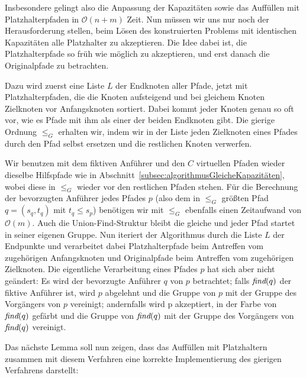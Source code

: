 Insbesondere gelingt also die Anpassung der Kapazitäten sowie das Auffüllen mit Platzhalterpfaden in $\mathcal O(n+m)$ Zeit.
Nun müssen wir uns nur noch der Herausforderung stellen, beim Lösen des konstruierten Problems mit identischen Kapazitäten alle
Platzhalter zu akzeptieren.
Die Idee dabei ist, die Platzhalterpfade so früh wie möglich zu akzeptieren, und erst danach die Originalpfade zu
betrachten.

Dazu wird zuerst eine Liste $L$ der Endknoten aller Pfade, jetzt mit Platzhalterpfaden, die die Knoten
aufsteigend und bei gleichem Knoten Zielknoten vor Anfangsknoten sortiert.
Dabei kommt jeder Knoten genau so oft vor, wie es Pfade mit ihm als einer der beiden Endknoten gibt.
Die gierige Ordnung $\leq_{G}$ erhalten wir, indem wir in der Liste jeden Zielknoten eines Pfades durch den Pfad selbst
ersetzen und die restlichen Knoten verwerfen.

Wir benutzen mit dem fiktiven Anführer und den $C$ virtuellen Pfaden wieder dieselbe Hilfspfade wie in
Abschnitt~\ref{subsec:algorithmusGleicheKapazitäten}, wobei diese in $\leq_G$ wieder vor den restlichen Pfaden stehen.
Für die Berechnung der bevorzugten Anführer jedes Pfades $p$ (also dem in $\leq_G$ größten Pfad $q = (s_q, t_q)$ mit
$t_q \leq s_p$) benötigen wir mit $\leq_G$ ebenfalls einen Zeitaufwand von
$\mathcal O(m)$.
Auch die Union-Find-Struktur bleibt die gleiche und jeder Pfad startet in seiner eigenen Gruppe.
Nun iteriert der Algorithmus durch die Liste $L$ der Endpunkte und verarbeitet dabei Platzhalterpfade beim Antreffen vom
zugehörigen Anfangsknoten und Originalpfade beim Antreffen vom zugehörigen Zielknoten.
Die eigentliche Verarbeitung eines Pfades $p$ hat sich aber nicht geändert: Es wird der bevorzugte Anführer $q$ von $p$
betrachtet;
falls $\text{\em find}(q)$ der fiktive Anführer ist, wird $p$ abgelehnt und die Gruppe von $p$ mit der
Gruppe des Vorgängers von $p$ vereinigt;
andernfalls wird p akzeptiert, in der Farbe von $\text{\em find}(q)$
gefärbt und die Gruppe von $\text{\em find}(q)$ mit der Gruppe des Vorgängers von $\text{\em find}(q)$ vereinigt.

Das nächste Lemma soll nun zeigen, dass das Auffüllen mit Platzhaltern zusammen mit diesem Verfahren eine korrekte
Implementierung des gierigen Verfahrens darstellt:

